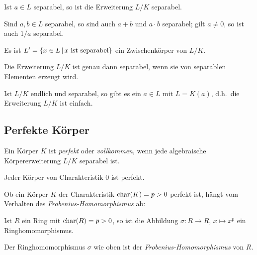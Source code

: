 \begin{lemma}
    Ist $a \in L$ separabel, so ist die Erweiterung $L/K$ separabel.
\end{lemma}

\begin{corollary}
  Sind $a, b \in L$ separabel, so sind auch $a + b$ und $a \cdot b$ separabel;
  gilt $a \neq 0$, so ist auch $1/a$ separabel.
\end{corollary}

\begin{corollary}
  Es ist $L' = \{x \in L \suchthat \text{$x$ ist separabel}\}$ ein Zwischenkörper von $L/K$.
\end{corollary}

\begin{corollary}
  Die Erweiterung $L/K$ ist genau dann separabel, wenn sie von separablen Elementen erzeugt wird.
\end{corollary}

\begin{theorem}
  Ist $L/K$ endlich und separabel, so gibt es ein $a \in L$ mit $L = K(a)$, d.h.\ die Erweiterung $L/K$ ist einfach.
\end{theorem}



\subsection{Perfekte Körper}

\begin{definition}
  Ein Körper $K$ ist \emph{perfekt} oder \emph{vollkommen}, wenn jede algebraische Körpererweiterung $L/K$ separabel ist.
\end{definition}

\begin{example}
  Jeder Körper von Charakteristik $0$ ist perfekt.
\end{example}

Ob ein Körper $K$ der Charakteristik $\operatorname{char}(K) = p > 0$ perfekt ist, hängt vom Verhalten des \emph{Frobenius-Homomorphismus} ab:

\begin{lemma}
  Ist $R$ ein Ring mit $\operatorname{char}(R) = p > 0$, so ist die Abbildung $\sigma \colon R \to R$, $x \mapsto x^p$ ein Ringhomomorphismus.
\end{lemma}

\begin{definition}
  Der Ringhomomorphismus $\sigma$ wie oben ist der \emph{Frobenius-Homo\-mor\-phis\-mus} von $R$.
\end{definition}

